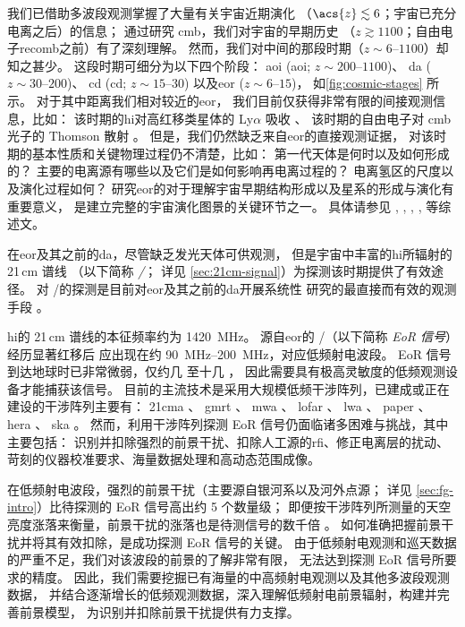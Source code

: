 我们已借助多波段观测掌握了大量有关宇宙近期演化
（$\acs{z} \lesssim 6$；宇宙已充分电离之后）的信息；
通过研究 \ac{cmb}，我们对宇宙的早期历史
（$z \gtrsim 1100$；自由电子\acl{recomb}之前）有了深刻理解。
然而，我们对中间的那段时期（$z \sim \numrange{6}{1100}$）却知之甚少。
这段时期可细分为以下四个阶段\cite{koopmans2015}：
\acl{aoi} (\acs{aoi}; $z \sim \numrange{200}{1100}$)、
\acl{da} ($z \sim \numrange{30}{200}$)、
\acl{cd} (\acs{cd}; $z \sim \numrange{15}{30}$)
以及\acl{eor} ($z \sim \numrange{6}{15}$)，
如\autoref{fig:cosmic-stages} 所示。
对于其中距离我们相对较近的\acl{eor}，
我们目前仅获得非常有限的间接观测信息，比如：
该时期的\ac{hi}对高红移类星体的 Ly$\alpha$ 吸收 \cite{becker2001}、
该时期的自由电子对 \ac{cmb} 光子的 Thomson 散射 \cite{kaplinghat2003}。
但是，我们仍然缺乏来自\acl{eor}的直接观测证据，
对该时期的基本性质和关键物理过程仍不清楚，比如：
第一代天体是何时以及如何形成的？
主要的电离源有哪些以及它们是如何影响再电离过程的？
电离氢区的尺度以及演化过程如何？
研究\acl{eor}的对于理解宇宙早期结构形成以及星系的形成与演化有重要意义，
是建立完整的宇宙演化图景的关键环节之一。
具体请参见 , ,
, ,
 等综述文。

在\acl{eor}及其之前的\acl{da}，尽管缺乏发光天体可供观测，
但是宇宙中丰富的\acl{hi}所辐射的 21\,cm 谱线
（以下简称 \emph{\hisignal/}；
详见 \autoref{sec:21cm-signal}）为探测该时期提供了有效途径。
对 \hisignal/的探测是目前对\acl{eor}及其之前的\acl{da}开展系统性
研究的最直接而有效的观测手段 \cite{koopmans2015,furlanetto2016}。

\acl{hi}的 21\,cm 谱线的本征频率约为 \SI{1420}{\MHz}。
源自\acl{eor}的 \hisignal/（以下简称 \emph{EoR 信号}）经历显著红移后
应出现在约 \SIrange{90}{200}{\MHz}，对应低频射电波段。
EoR 信号到达地球时已非常微弱，仅约几 \si{\mK} 至十几 \si{\mK}，
因此需要具有极高灵敏度的低频观测设备才能捕获该信号。
目前的主流技术是采用大规模低频干涉阵列，已建成或正在建设的干涉阵列主要有：
\ac{21cma} \cite{zheng2016}、
\ac{gmrt} \cite{paciga2011}、
\ac{mwa} \cite{bowman2013,tingay2013}、
\ac{lofar} \cite{vanHaarlem2013}、
\ac{lwa} \cite{ellingson2009}、
\ac{paper} \cite{parsons2010}、
\ac{hera} \cite{deboer2017}、
\ac{ska} \cite{mellema2013,koopmans2015}。
然而，利用干涉阵列探测 EoR 信号仍面临诸多困难与挑战，其中主要包括：
识别并扣除强烈的前景干扰、扣除人工源的\ac{rfi}、修正电离层的扰动、
苛刻的仪器校准要求、海量数据处理和高动态范围成像。

在低频射电波段，强烈的前景干扰（主要源自银河系以及河外点源；
详见 \autoref{sec:fg-intro}）比待探测的 EoR 信号高出约 5 个数量级；
即便按干涉阵列所测量的天空亮度涨落来衡量，前景干扰的涨落也是待测信号的数千倍
\cite{zaroubi2013}。
如何准确把握前景干扰并将其有效扣除，是成功探测 EoR 信号的关键。
由于低频射电观测和巡天数据的严重不足，我们对该波段的前景的了解非常有限，
无法达到探测 EoR 信号所要求的精度。
因此，我们需要挖掘已有海量的中高频射电观测以及其他多波段观测数据，
并结合逐渐增长的低频观测数据，深入理解低频射电前景辐射，构建并完善前景模型，
为识别并扣除前景干扰提供有力支撑。

